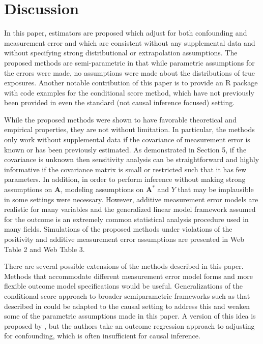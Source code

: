\documentclass[useAMS,usenatbib,referee]{biom}
\begin{document}
\section{Discussion}

In this paper, estimators are proposed which adjust for both confounding and measurement error and which are consistent without any supplemental data and without specifying strong distributional or extrapolation assumptions. The proposed methods are semi-parametric in that while parametric assumptions for the errors were made, no assumptions were made about the distributions of true exposures. Another notable contribution of this paper is to provide an R package with code examples for the conditional score method, which have not previously been provided in even the standard (not causal inference focused) setting.

While the proposed methods were shown to have favorable theoretical and empirical properties, they are not without limitation. In particular, the methods only work without supplemental data if the covariance of measurement error is known or has been previously estimated. As demonstrated in Section 5, if the covariance is unknown then sensitivity analysis can be straightforward and highly informative if the covariance matrix is small or restricted such that it has few parameters. In addition, in order to perform inference without making strong assumptions on $\bm{A}$, modeling assumptions on $\bm{A}^{*}$ and $Y$ that may be implausible in some settings were necessary. However, additive measurement error models are realistic for many variables and the generalized linear model framework assumed for the outcome is an extremely common statistical analysis procedure used in many fields. Simulations of the proposed methods under violations of the positivity and additive measurement error assumptions are presented in Web Table 2 and Web Table 3.

There are several possible extensions of the methods described in this paper. Methods that accommodate different measurement error model forms and more flexible outcome model specifications would be useful. Generalizations of the conditional score approach to broader semiparametric frameworks such as that described in \citet{tsiatis2004} could be adapted to the causal setting to address this and weaken some of the parametric assumptions made in this paper. A version of this idea is proposed by \citet{liu2017}, but the authors take an outcome regression approach to adjusting for confounding, which is often insufficient for causal inference.
\end{document}
